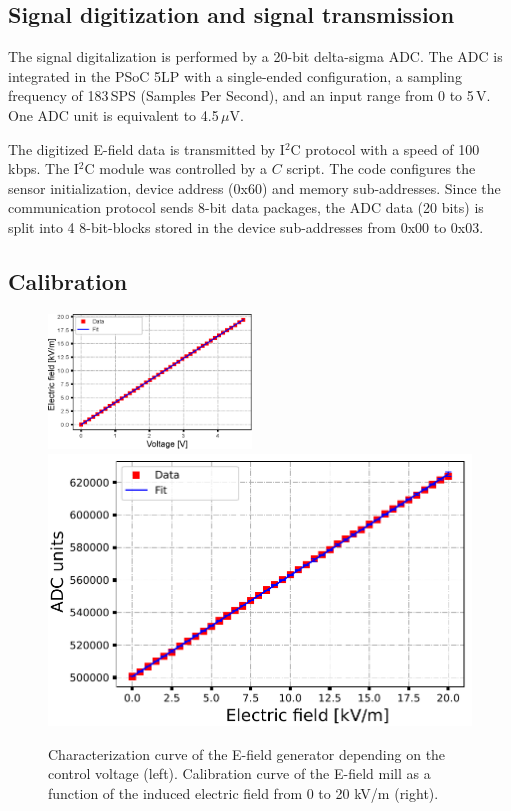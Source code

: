 \documentclass[letterpaper,12pt]{article}
\begin{document}
\subsection{Signal digitization and signal transmission}

The signal digitalization is performed by a 20-bit delta-sigma ADC. The ADC is integrated in the PSoC 5LP with a single-ended configuration, a sampling frequency of 183\,SPS (Samples Per Second), and an input range from 0 to 5\,V. One ADC unit is equivalent to 4.5\,$\mu$V.

The digitized E-field data is transmitted by I$^{2}$C protocol with a speed of 100\,kbps. The I$^{2}$C module was controlled by a $C$ script. The code configures the sensor initialization, device address (0x60) and memory sub-addresses. Since the communication protocol sends 8-bit data packages, the ADC data (20 bits) is split into 4 8-bit-blocks stored in the device sub-addresses from 0x00 to 0x03.

\subsection{Calibration}

\begin{figure}[h]
\begin{center}
\includegraphics[width=0.48\textwidth]{Figures/Fuente_E.eps}
\includegraphics[width=.5\textwidth]{Figures/emill_v2.pdf}
\caption{\label{cal_fuente} Characterization curve of the E-field generator depending on the control voltage (left). Calibration curve of the E-field mill as a function of the induced electric field from 0 to 20 kV/m (right).}
\label{cal_fuente}
\end{center}
\end{figure}
\end{document}
